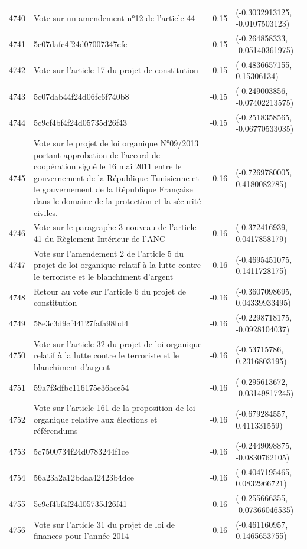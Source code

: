 \begin{table}[ht]
\begin{tabular}{rlrl}
  4740 & Vote sur un amendement n°12 de l'article 44 & -0.15 & (-0.3032913125, -0.0107503123) \\ 
  4741 & 5c07dafc4f24d07007347cfe & -0.15 & (-0.264858333, -0.05140361975) \\ 
  4742 & Vote sur l'article 17 du projet de constitution & -0.15 & (-0.4836657155, 0.15306134) \\ 
  4743 & 5c07dab44f24d06fc6f740b8 & -0.15 & (-0.249003856, -0.07402213575) \\ 
  4744 & 5c9cf4bf4f24d05735d26f43 & -0.15 & (-0.2518358565, -0.06770533035) \\ 
  4745 & Vote sur le projet de loi organique N°09/2013 portant approbation de l'accord de coopération signé le 16 mai 2011 entre le gouvernement de la République Tunisienne et le gouvernement de la République Française dans le domaine de la protection et la sécurité civiles. & -0.16 & (-0.7269780005, 0.4180082785) \\ 
  4746 & Vote sur le paragraphe 3 nouveau de l'article 41 du Règlement Intérieur de l'ANC & -0.16 & (-0.372416939, 0.0417858179) \\ 
  4747 & Vote sur l'amendement 2 de l'article 5 du projet de loi organique relatif à la lutte contre le terroriste et le blanchiment d'argent & -0.16 & (-0.4695451075, 0.1411728175) \\ 
  4748 & Retour au vote sur l'article 6 du projet de constitution & -0.16 & (-0.3607098695, 0.04339933495) \\ 
  4749 & 58e3c3d9cf44127fafa98bd4 & -0.16 & (-0.2298718175, -0.0928104037) \\ 
  4750 & Vote sur l'article 32 du projet de loi organique relatif à la lutte contre le terroriste et le blanchiment d'argent & -0.16 & (-0.53715786, 0.2316803195) \\ 
  4751 & 59a7f3dfbc116175e36ace54 & -0.16 & (-0.295613672, -0.03149817245) \\ 
  4752 & Vote sur l'article 161 de la proposition de loi organique relative aux élections et référendums & -0.16 & (-0.679284557, 0.411331559) \\ 
  4753 & 5c7500734f24d0783244f1ce & -0.16 & (-0.2449098875, -0.0830762105) \\ 
  4754 & 56a23a2a12bdaa42423b4dce & -0.16 & (-0.4047195465, 0.0832966721) \\ 
  4755 & 5c9cf4bf4f24d05735d26f41 & -0.16 & (-0.255666355, -0.07366046535) \\ 
  4756 & Vote sur l'article 31 du projet de loi de finances pour l'année 2014 & -0.16 & (-0.461160957, 0.1465653755) \\ 

\end{tabular}
\end{table}

